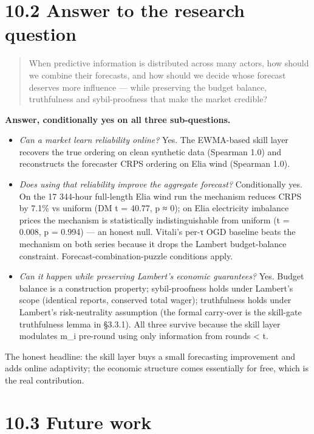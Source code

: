 \documentclass[11pt,a4paper,openany]{report}
\begin{document}
\section{10.2 Answer to the research question}

\begin{quote}
When predictive information is distributed across many actors, how
should we combine their forecasts, and how should we decide whose
forecast deserves more influence — while preserving the budget
balance, truthfulness and sybil-proofness that make the market
credible?

\end{quote}
\textbf{Answer, conditionally yes on all three sub-questions.}

\begin{itemize}
  \item \emph{Can a market learn reliability online?} Yes. The EWMA-based skill
    layer recovers the true ordering on clean synthetic data (Spearman
    1.0) and reconstructs the forecaster CRPS ordering on Elia wind
    (Spearman 1.0).
  \item \emph{Does using that reliability improve the aggregate forecast?}
    Conditionally yes. On the 17 344-hour full-length Elia wind run the
    mechanism reduces CRPS by 7.1\% vs uniform (DM t = 40.77, p ≈ 0);
    on Elia electricity imbalance prices the mechanism is statistically
    indistinguishable from uniform (t = 0.008, p = 0.994) — an honest
    null. Vitali's per-τ OGD baseline beats the mechanism on both
    series because it drops the Lambert budget-balance constraint.
    Forecast-combination-puzzle conditions apply.
  \item \emph{Can it happen while preserving Lambert's economic guarantees?} Yes.
    Budget balance is a construction property; sybil-proofness holds
    under Lambert's scope (identical reports, conserved total wager);
    truthfulness holds under Lambert's risk-neutrality assumption (the
    formal carry-over is the skill-gate truthfulness lemma in §3.3.1).
    All three survive because the skill layer modulates m\_i pre-round
    using only information from rounds < t.
\end{itemize}

The honest headline: the skill layer buys a small forecasting
improvement and adds online adaptivity; the economic structure comes
essentially for free, which is the real contribution.

\section{10.3 Future work}
\end{document}
